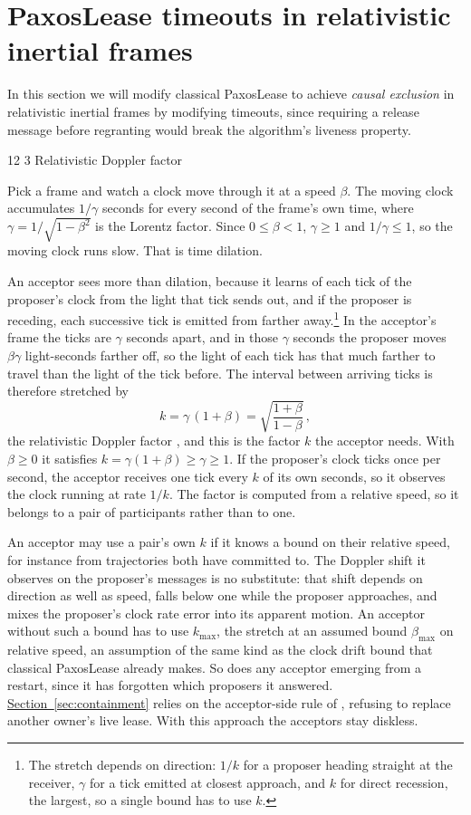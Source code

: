 \documentclass[final,5p,times,twocolumn,number]{elsarticle}
\makeatletter
\newcommand{\secref}[1]{\hyperref[#1]{Section~\ref*{#1}}}
\renewcommand\subsection{\@startsection{subsection}{2}{\z@}%
           {12\p@ \@plus 6\p@ \@minus 3\p@}%
           {3\p@ \@plus 6\p@ \@minus 3\p@}%
           {\normalfont\normalsize\bfseries}}
\makeatother
\begin{document}
\section{PaxosLease timeouts in relativistic inertial frames}\label{sec:rules}
In this section we will modify classical PaxosLease to achieve \emph{causal exclusion} in relativistic inertial frames by modifying timeouts, since requiring a release message before regranting would break the algorithm's liveness property.

\subsection{Relativistic Doppler factor}\label{sec:doppler}

Pick a frame and watch a clock move through it at a speed $\beta$.  The moving clock accumulates $1/\gamma$ seconds for every second of the frame's own time, where $\gamma = 1/\sqrt{1-\beta^2}$ is the Lorentz factor.  Since $0 \leq \beta < 1$, $\gamma \geq 1$ and $1/\gamma \leq 1$, so the moving clock runs slow.  That is time dilation.

An acceptor sees more than dilation, because it learns of each tick of the proposer's clock from the light that tick sends out, and if the proposer is receding, each successive tick is emitted from farther away.\footnote{The stretch depends on direction: $1/k$ for a proposer heading straight at the receiver, $\gamma$ for a tick emitted at closest approach, and $k$ for direct recession, the largest, so a single bound has to use $k$.}  In the acceptor's frame the ticks are $\gamma$ seconds apart, and in those $\gamma$ seconds the proposer moves $\beta\gamma$ light-seconds farther off, so the light of each tick has that much farther to travel than the light of the tick before.  The interval between arriving ticks is therefore stretched by
\[
  k = \gamma\,(1+\beta) = \sqrt{\frac{1+\beta}{1-\beta}}\,,
\]
the relativistic Doppler factor \cite{ref4}, and this is the factor $k$ the acceptor needs.  With $\beta \geq 0$ it satisfies $k = \gamma(1+\beta) \geq \gamma \geq 1$.  If the proposer's clock ticks once per second, the acceptor receives one tick every $k$ of its own seconds, so it observes the clock running at rate $1/k$.  The factor is computed from a relative speed, so it belongs to a pair of participants rather than to one.

An acceptor may use a pair's own $k$ if it knows a bound on their relative speed, for instance from trajectories both have committed to.  The Doppler shift it observes on the proposer's messages is no substitute: that shift depends on direction as well as speed, falls below one while the proposer approaches, and mixes the proposer's clock rate error into its apparent motion.  An acceptor without such a bound has to use $k_{\max}$, the stretch at an assumed bound $\beta_{\max}$ on relative speed, an assumption of the same kind as the clock drift bound that classical PaxosLease already makes.  So does any acceptor emerging from a restart, since it has forgotten which proposers it answered.  \secref{sec:containment} relies on the acceptor-side rule of \cite{ref2}, refusing to replace another owner's live lease.  With this approach the acceptors stay diskless.
\end{document}
